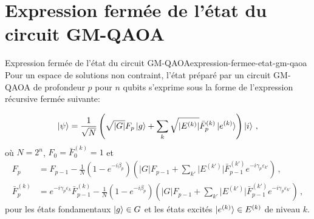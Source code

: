 \begin{comment}
\end{comment}


\chapter{Expression fermée de l'état du circuit GM-QAOA}
\label{ann:expression-fermee-etat-circuit-gm-qaoa}


\begin{maintheorem}{Expression fermée de l'état du circuit GM-QAOA}{expression-fermee-etat-gm-qaoa}
    Pour un espace de solutions non contraint, l'état préparé par un circuit GM-QAOA de profondeur $p$ pour $n$ qubits s'exprime sous la forme de l'expression récursive fermée suivante:

    \begin{equation}
        \label{eq:recursive-formula}
        \ket{\psi} = \frac{1}{\sqrt{ N }} \left( \sqrt{ \lvert G \rvert } F_{p} \ket{g} + \sum_{k} \sqrt{ \lvert E^{(k)} \rvert } \bar{F}^{(k)}_{p} \ket{e^{(k)}} \right) \ket{i} \,,
    \end{equation}
    où $N=2^{n}$, $F_{0}=\bar{F}_{0}^{(k)}=1$ et
    \begin{align*}
        F_{p} &= F_{p-1} - \frac{1}{N} (1-e^{-i\beta_{p}}) \left( \lvert G \rvert   F_{p-1} + \sum_{k'} \lvert E^{(k')} \rvert \bar{F}^{(k')}_{p-1} e^{-i\gamma_{p}\varepsilon_{k'}} \right) \,, \\
        \bar{F}^{(k)}_{p} &= e^{-i\gamma_{p} \varepsilon_{k}}\bar{F}_{p-1}^{(k)} - \frac{1}{N} (1-e^{-i\beta_{p}}) \left( \lvert G \rvert   F_{p-1} + \sum_{k'} \lvert E^{(k')} \rvert \bar{F}^{(k')}_{p-1} e^{-i\gamma_{p}\varepsilon_{k'}} \right) \,,
    \end{align*}
    pour les états fondamentaux $\ket{g} \in G$ et les états excités $\ket{e^{(k)}} \in E^{(k)}$ de niveau $k$.
\end{maintheorem}

